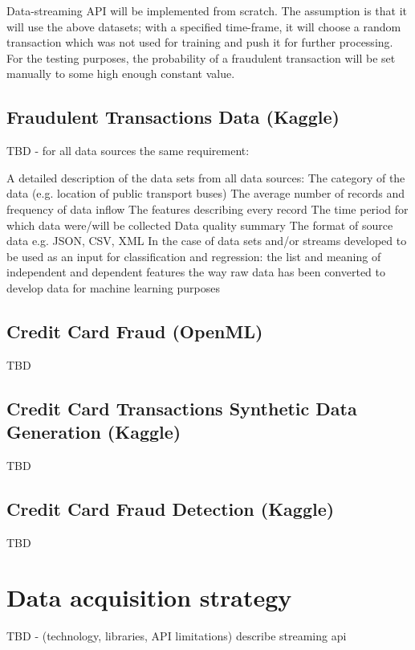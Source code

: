 \documentclass[12pt,a4paper, hidelinks]{article}
\begin{document}
Data-streaming API will be implemented from scratch. The assumption is that it will use the above datasets; with a specified time-frame, it will choose a random transaction which was not used for training and push it for further processing. For the testing purposes, the probability of a fraudulent transaction will be set manually to some high enough constant value.

\subsection{Fraudulent Transactions Data (Kaggle)}

TBD - for all data sources the same requirement: 

A detailed description of the data sets from all data sources:
The category of the data (e.g. location of public transport buses)
The average number of records and frequency of data inflow
The features describing every record
The time period for which data were/will be collected
Data quality summary
The format of source data e.g. JSON, CSV, XML
In the case of data sets and/or streams developed to be used as an input for classification and regression: 
the list and meaning of independent and dependent features 
the way raw data has been converted to develop data for machine learning purposes

\subsection{Credit Card Fraud (OpenML)}

TBD

\subsection{Credit Card Transactions Synthetic Data Generation (Kaggle)}

TBD

\subsection{Credit Card Fraud Detection (Kaggle)}

TBD

\newpage

\section{Data acquisition strategy}

TBD - (technology, libraries, API limitations)
describe streaming api
\end{document}
